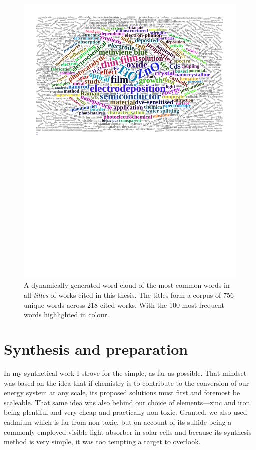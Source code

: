 \documentclass[draft,webedition,openright,titles,swedish,english]{LuaUUThesis}\usepackage[]{graphicx}\usepackage[]{xcolor}
\begin{document}
\begin{figure}[tbp]
\centering
\includegraphics[trim={1.2cm 14.9cm 1.2cm 1.2cm},clip,width=4.72in]{0100-fig-bcf-titlewords}
\caption[Word cloud of all titles in the bibliography]{%
   A dynamically generated word cloud of the most common words in all
   \emph{titles} of works cited in this thesis.
   The titles form a corpus of \num{756} unique words across
   \num{218} cited works.
   With the \num{100} most frequent words highlighted in colour.}
\label{fig:0100-wordcloud-thesis-corpus}
\end{figure}






\chapter{Synthesis and preparation}
\label{ch:synthesis}


In my synthetical work I strove for the simple, as far as possible.
That mindset was based on the idea that if chemistry is to contribute to the
conversion of our energy system at any scale, its proposed solutions must
first and foremost be scaleable.
That same idea was also behind our choice of elements---zinc and iron being
plentiful and very cheap and practically non-toxic.
Granted, we also used cadmium which is far from non-toxic, but on account of
its sulfide being a commonly employed visible-light absorber in solar cells and because
its synthesis method is very simple, it was too tempting a target to overlook.
\end{document}
